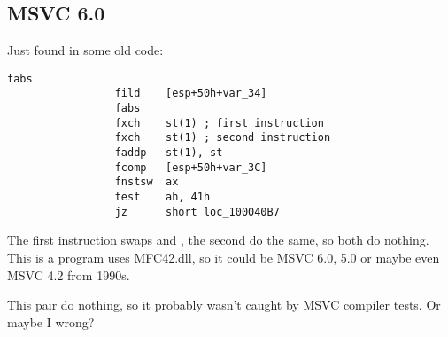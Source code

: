\subsection{MSVC 6.0}

Just found in some old code:

\begin{lstlisting}[style=customasmx86]
                 fabs
                 fild    [esp+50h+var_34]
                 fabs
                 fxch    st(1) ; first instruction
                 fxch    st(1) ; second instruction
                 faddp   st(1), st
                 fcomp   [esp+50h+var_3C]
                 fnstsw  ax
                 test    ah, 41h
                 jz      short loc_100040B7
\end{lstlisting}

The first  instruction swaps  and , the second do the same, so both do nothing.
This is a program uses MFC42.dll, so it could be MSVC 6.0, 5.0 or maybe even MSVC 4.2 from 1990s.

This pair do nothing, so it probably wasn't caught by MSVC compiler tests.
Or maybe I wrong?

